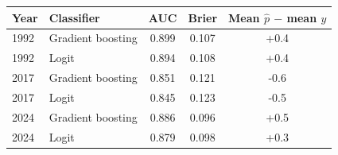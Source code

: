 \begin{tabular}{llccc}
\toprule
Year & Classifier & AUC & Brier & Mean $\hat p$ $-$ mean $y$ \\
\midrule
1992 & Gradient boosting & 0.899 & 0.107 & +0.4 \\
1992 & Logit & 0.894 & 0.108 & +0.4 \\
2017 & Gradient boosting & 0.851 & 0.121 & -0.6 \\
2017 & Logit & 0.845 & 0.123 & -0.5 \\
2024 & Gradient boosting & 0.886 & 0.096 & +0.5 \\
2024 & Logit & 0.879 & 0.098 & +0.3 \\
\bottomrule
\end{tabular}
